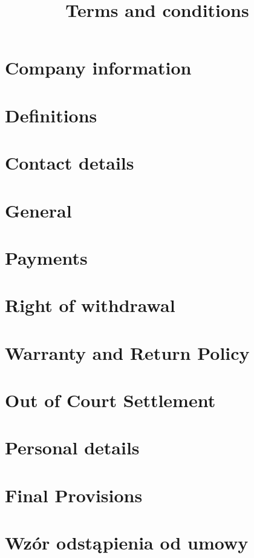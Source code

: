 \documentclass[10pt,a4paper]{article}
\title{Terms and conditions \shopname} %
\author{}
\date{}
\begin{document}
	\maketitle

	\section{Company information}
		



	\section{Definitions}
		

		
		
	\section{Contact details}
			
		
		
	\section{General}
		
		
		
		
	\section{Payments}
		
		
			
		\section{Right of withdrawal}
			
			

		\section{Warranty and Return Policy}
			
			
		\section{Out of Court Settlement}
			
			

		\section{Personal details}
				

	\section{Final  Provisions}
			
	
	\section{Wzór odstąpienia od umowy}
			
\end{document}
